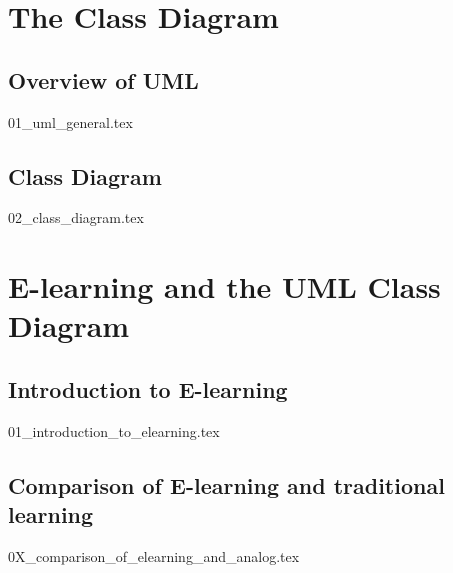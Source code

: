 \chapter{The Class Diagram}

\section{Overview of UML}
{01_uml_general.tex}

\section{Class Diagram}
{02_class_diagram.tex}



\chapter{E-learning and the UML Class Diagram}


\section{Introduction to E-learning}


{01_introduction_to_elearning.tex}

\section{Comparison of E-learning and traditional learning}


{0X_comparison_of_elearning_and_analog.tex}




